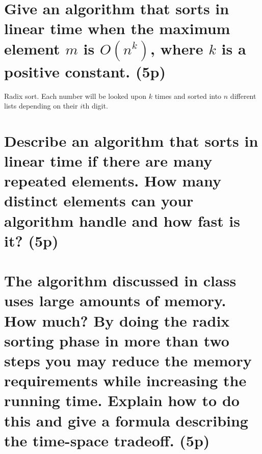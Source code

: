 \documentclass[a4paper,10pt,titlepage]{article}
\begin{document}
\section {Give an algorithm that sorts in linear time when the maximum element $m$ is $O(n^k)$, where $k$ is a positive constant. (5p)}

Radix sort. Each number will be looked upon $k$ times and sorted into $n$ different lists depending on their $i$th digit.

\section {Describe an algorithm that sorts in linear time if there are many repeated elements. How many distinct elements can your algorithm handle and how fast is it? (5p)}

\section {The algorithm discussed in class uses large amounts of memory. How much? By doing the radix sorting phase in more than two steps you may reduce the memory requirements while increasing the running time. Explain how to do this and give a formula describing the time-space tradeoff. (5p)}
\end{document}
